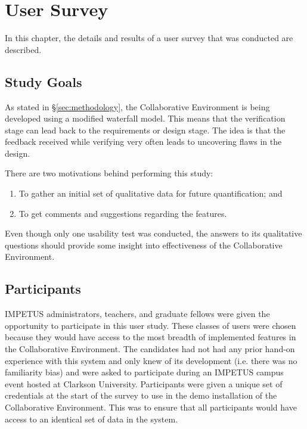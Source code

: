 \chapter{User Survey}
\label{chap:usability}

In this chapter, the details and results of a user survey that was conducted are described.

\section{Study Goals}
As stated in \S \ref{sec:methodology}, the Collaborative Environment is being developed using a modified waterfall model. This means that the verification stage can lead back to the requirements or design stage. The idea is that the feedback received while verifying very often leads to uncovering flaws in the design.

There are two motivations behind performing this study:
\begin{enumerate}
	\item To gather an initial set of qualitative data for future quantification; and
	\item To get comments and suggestions regarding the features.
\end{enumerate}

Even though only one usability test was conducted, the answers to its qualitative questions should provide some insight into effectiveness of the Collaborative Environment.

\section{Participants}
IMPETUS administrators, teachers, and graduate fellows were given the opportunity to participate in this user study. These classes of users were chosen because they would have access to the most breadth of implemented features in the Collaborative Environment. The candidates had not had any prior hand-on experience with this system and only knew of its development (i.e. there was no familiarity bias) and were asked to participate during an IMPETUS campus event hosted at Clarkson University. Participants were given a unique set of credentials at the start of the survey to use in the demo installation of the Collaborative Environment. This was to ensure that all participants would have access to an identical set of data in the system.

